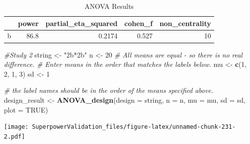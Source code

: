 \documentclass[]{book}
\newenvironment{Shaded}{\begin{snugshade}}{\end{snugshade}}
\newcommand{\CommentTok}[1]{\textcolor[rgb]{0.56,0.35,0.01}{\textit{#1}}}
\newcommand{\DataTypeTok}[1]{\textcolor[rgb]{0.13,0.29,0.53}{#1}}
\newcommand{\DecValTok}[1]{\textcolor[rgb]{0.00,0.00,0.81}{#1}}
\newcommand{\FloatTok}[1]{\textcolor[rgb]{0.00,0.00,0.81}{#1}}
\newcommand{\KeywordTok}[1]{\textcolor[rgb]{0.13,0.29,0.53}{\textbf{#1}}}
\newcommand{\NormalTok}[1]{#1}
\newcommand{\OperatorTok}[1]{\textcolor[rgb]{0.81,0.36,0.00}{\textbf{#1}}}
\newcommand{\OtherTok}[1]{\textcolor[rgb]{0.56,0.35,0.01}{#1}}
\newcommand{\StringTok}[1]{\textcolor[rgb]{0.31,0.60,0.02}{#1}}
\begin{document}
\begin{table}[!h]

\caption{\label{tab:unnamed-chunk-231}ANOVA Results}
\centering
\begin{tabular}{l|r|r|r|r}
\hline
  & power & partial\_eta\_squared & cohen\_f & non\_centrality\\
\hline
b & 86.8 & 0.2174 & 0.527 & 10\\
\hline
\end{tabular}
\end{table}

\begin{Shaded}
\begin{Highlighting}[]
\CommentTok{#Study 2}
\NormalTok{string <-}\StringTok{ "2b*2b"}
\NormalTok{n <-}\StringTok{ }\DecValTok{20}
\CommentTok{# All means are equal - so there is no real difference.}
\CommentTok{# Enter means in the order that matches the labels below.}
\NormalTok{mu <-}\StringTok{ }\KeywordTok{c}\NormalTok{(}\DecValTok{1}\NormalTok{, }\DecValTok{2}\NormalTok{, }\DecValTok{1}\NormalTok{, }\DecValTok{3}\NormalTok{) }
\NormalTok{sd <-}\StringTok{ }\DecValTok{1}

\CommentTok{# the label names should be in the order of the means specified above.}
\NormalTok{design_result <-}\StringTok{ }\KeywordTok{ANOVA_design}\NormalTok{(}\DataTypeTok{design =}\NormalTok{ string,}
                   \DataTypeTok{n =}\NormalTok{ n, }
                   \DataTypeTok{mu =}\NormalTok{ mu, }
                   \DataTypeTok{sd =}\NormalTok{ sd, }
                   \DataTypeTok{plot =} \OtherTok{TRUE}\NormalTok{)}
\end{Highlighting}
\end{Shaded}

\texttt{[image: SuperpowerValidation\_files/figure-latex/unnamed-chunk-231-2.pdf]}

\begin{Shaded}
\end{Shaded}
\end{document}
